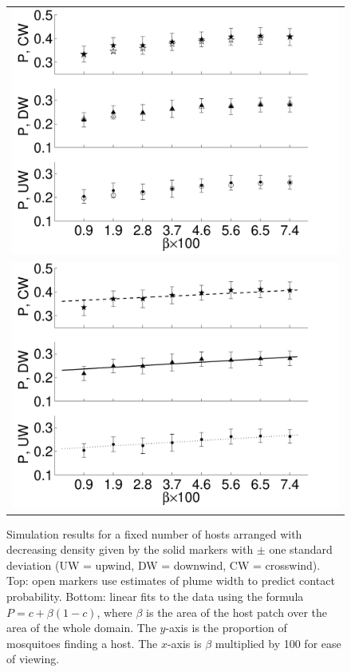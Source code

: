 \documentclass[12pt]{article}
\newcommand{\mycaption}[1]{\caption{#1}}
\begin{document}
\begin{figure}[htp]
	\centering
	\begin{tabular}{c}
	\includegraphics[width=5.4in]{figures/Results_density.pdf} \\
	\includegraphics[width=5.4in]{figures/Results_density2.pdf}
\end{tabular}
\mycaption{Simulation results for a fixed number of hosts arranged with decreasing density given by the solid markers with $\pm$ one standard deviation (UW = upwind, DW = downwind, CW = crosswind). Top: open markers use estimates of plume width to predict contact probability. Bottom: linear fits to the data using the formula $P = c + \beta(1-c)$, where $\beta$ is the area of the host patch over the area of the whole domain. The $y$-axis is the proportion of mosquitoes finding a host. The $x$-axis is $\beta$ multiplied by 100 for ease of viewing.}
	\label{fig:Density}
\end{figure}
\end{document}
